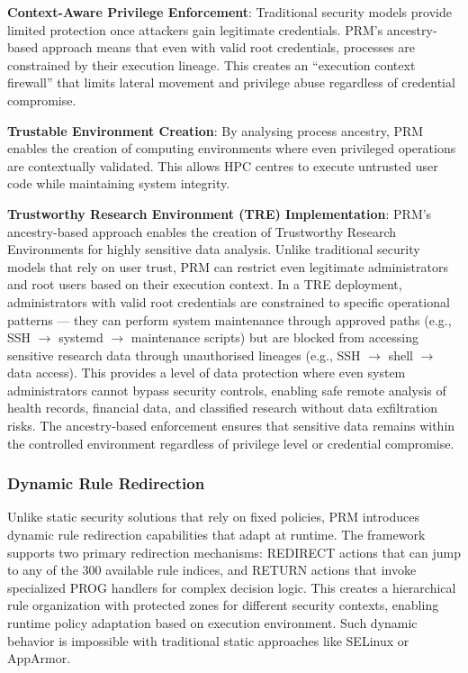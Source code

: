 \documentclass[]{sn-jnl}
\begin{document}
\textbf{Context-Aware Privilege Enforcement}: Traditional security models provide
limited protection once attackers gain legitimate credentials. PRM's
ancestry-based approach means that even with valid root credentials, processes are
constrained by their execution lineage. This creates an ``execution context
firewall'' that limits lateral movement and privilege abuse regardless of
credential compromise.

\textbf{Trustable Environment Creation}: By analysing process ancestry, PRM
enables the creation of computing environments where even privileged operations
are contextually validated. This allows HPC centres to execute untrusted user
code while maintaining system integrity.

\textbf{Trustworthy Research Environment (TRE) Implementation}: PRM's
ancestry-based approach enables the creation of Trustworthy Research Environments
for highly sensitive data analysis. Unlike traditional security models that rely
on user trust, PRM can restrict even legitimate administrators and root users based
on their execution context. In a TRE deployment, administrators with valid root
credentials are constrained to specific operational patterns --- they can perform
system maintenance through approved paths (e.g., SSH $\rightarrow$ systemd
$\rightarrow$ maintenance scripts) but are blocked from accessing sensitive research
data through unauthorised lineages (e.g., SSH $\rightarrow$ shell $\rightarrow$
data access). This provides a level of data protection where even system
administrators cannot bypass security controls, enabling safe remote analysis of
health records, financial data, and classified research without data exfiltration
risks. The ancestry-based enforcement ensures that sensitive data remains within the
controlled environment regardless of privilege level or credential compromise.

\subsubsection{Dynamic Rule Redirection}

Unlike static security solutions that rely on fixed policies, PRM introduces
dynamic rule redirection capabilities that adapt at runtime. The framework
supports two primary redirection mechanisms: REDIRECT actions that can jump to
any of the 300 available rule indices, and RETURN actions that invoke specialized
PROG handlers for complex decision logic. This creates a hierarchical rule
organization with protected zones for different security contexts, enabling
runtime policy adaptation based on execution environment. Such dynamic behavior
is impossible with traditional static approaches like SELinux or AppArmor.
\end{document}
